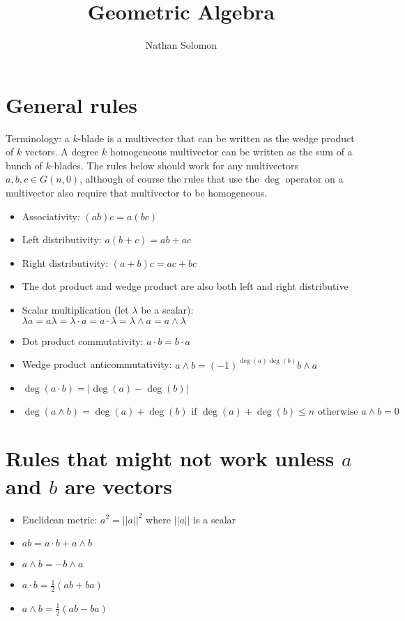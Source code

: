 \documentclass[12pt]{article}
\begin{document}
\title{Geometric Algebra}
\author{Nathan Solomon}
\maketitle

\section{General rules}
Terminology: a $k$-blade is a multivector that can be written as the wedge product of $k$ vectors. A degree $k$ homogeneous multivector can be written as the sum of a bunch of $k$-blades. The rules below should work for any multivectors $a, b, c \in G(n, 0)$, although of course the rules that use the $\deg$ operator on a multivector also require that multivector to be homogeneous.
\begin{itemize}
    \item Associativity: $(ab)c = a(bc)$
    \item Left distributivity: $a(b+c) = ab+ac$
    \item Right distributivity: $(a+b)c = ac+bc$
    \item The dot product and wedge product are also both left and right distributive
    \item Scalar multiplication (let $\lambda$ be a scalar): $\lambda a = a \lambda = \lambda \cdot a = a \cdot \lambda = \lambda \wedge a = a \wedge \lambda$
    \item Dot product commutativity: $a \cdot b = b \cdot a$
    \item Wedge product anticommutativity: $a \wedge b = (-1)^{\deg(a) \deg(b)} b \wedge a$
    \item $\deg(a \cdot b) = | \deg(a) - \deg(b) |$
    \item $\deg(a \wedge b) = \deg(a) + \deg(b) \text{ if } \deg(a) + \deg(b) \leq n \text{ otherwise } a \wedge b = 0$
\end{itemize}

\section{Rules that might not work unless $a$ and $b$ are vectors}
\begin{itemize}
    \item Euclidean metric: $a^2 = ||a||^2$ where $||a||$ is a scalar
    \item $ab = a \cdot b + a \wedge b$
    \item $a \wedge b = - b \wedge a$
    \item $a \cdot b = \frac{1}{2}(ab + ba)$
    \item $a \wedge b = \frac{1}{2} (ab - ba)$
\end{itemize}
\end{document}
